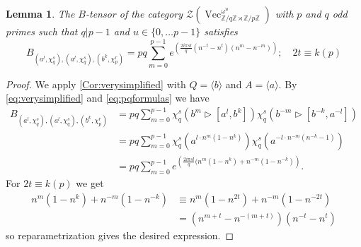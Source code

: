 \documentclass[11pt]{book}
\newtheorem{Lem}[theorem]{Lemma}
\theoremstyle{Rem}
\theoremstyle{definition}
\numberwithin{equation}{section}
\newcommand\hit{\triangleright}
\newcommand\Vect{\operatorname{Vec}}
\newcommand\ZZ{\mathbb Z}
\newcommand\CTR{\mathcal Z}
\newcommand\semdir{\rtimes}
\begin{document}
\begin{Lem}\label{BProp} The $B$-tensor of the category $\CTR(\Vect_{\ZZ/q\ZZ \semdir \ZZ/p\ZZ}^{\omega^u})$ with $p$ and $q$ odd primes such that $q|p-1$ and $u\in\{0,\dots p-1\}$ satisfies
\begin{equation}
B_{(a^l,\chi_q^s),(a^l, \chi_q^s),(b^{k}, \chi_p^r)}=p q \sum_{m=0}^{p-1} e^{\left(\frac{2i\pi sl}{q} (n^{-t}-n^t)(n^m-n^{-m})\right)};\quad 2t\equiv k(p) 
\end{equation}
\end{Lem}

\begin{proof}
We apply \cref{Cor:verysimplified} with $Q=\langle b\rangle$ and $A=\langle a\rangle$.
By \cref{eq:verysimplified} and \cref{eq:pqformulas} we have
\begin{align*}
  B_{(a^l,\chi_q^s),(a^l, \chi_q^s),(b^k, \chi_p^r)} &=pq\sum_{m=0}^{p-1}\chi_q^s(b^m \hit[a^l,b^k])\chi_q^s(b^{-m} \hit[b^{-k},a^{-l}] )\\
  &=p q \sum_{m=0}^{p-1} \chi_q^s(a^{l \cdot n^m (1-n^k)})\chi_q^s(a^{-l \cdot n^{-m} (n^{-k}-1)})\\
&= p q \sum_{m=0}^{p-1} e^{\left(\frac{2i\pi sl}{q} (n^{m}(1-n^k)+n^{-m}(1-n^{-k})\right)}.
\end{align*}
For $2t\equiv k(p)$ we get
\begin{align*}
  n^{m}(1-n^k)+n^{-m}(1-n^{-k})&\equiv n^m(1-n^{2t})+n^{-m}(1-n^{-2t})\\&=(n^{m+t}-n^{-(m+t)})(n^{-t}-n^t)
\end{align*}
so reparametrization gives the desired expression.
\end{proof}
\end{document}
